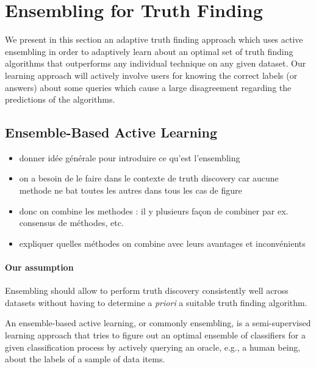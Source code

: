 \section{Ensembling for Truth Finding}\label{ensembling}
We present in this section an adaptive truth finding approach which uses active ensembling in order to 
adaptively learn about an optimal set of truth finding algorithms that outperforms any individual
technique on any given dataset. Our learning approach will actively involve users for knowing the correct
labels (or answers) about some queries which cause a large disagreement regarding the predictions of the algorithms.

\subsection{Ensemble-Based Active Learning}
\begin{itemize}
\item donner idée générale pour introduire  ce qu'est l'ensembling
\item on a besoin de le faire dans le contexte de truth discovery car aucune methode ne bat toutes les autres dans tous les cas de figure
\item donc on combine les methodes : il y plusieurs façon de combiner par ex. consensus de méthodes, etc.
\item expliquer quelles méthodes on combine avec leurs avantages et inconvénients
\end{itemize}

\medskip

\paragraph*{Our assumption} Ensembling should allow to perform truth discovery consistently well across datasets
without having to determine a \emph{priori} a suitable truth finding algorithm.

\medskip
An ensemble-based active learning, or commonly ensembling, is a semi-supervised learning approach that tries
to figure out an optimal ensemble of classifiers for a given classification process by actively querying an 
oracle, e.g., a human being, about the labels of a sample of data items.


